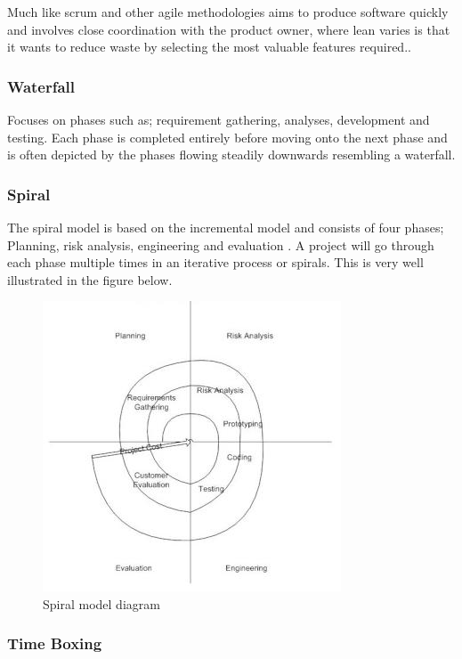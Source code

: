 Much like scrum and other agile methodologies aims to produce software
quickly and involves close coordination with the product owner, where
lean varies is that it wants to reduce waste by selecting the most
valuable features required.\parencite{agilemethods}.

\subsubsection{Waterfall}\label{waterfall}

Focuses on phases such as; requirement gathering, analyses, development
and testing. Each phase is completed entirely before moving onto the
next phase and is often depicted by the phases flowing steadily
downwards resembling a waterfall.

\subsubsection{Spiral}\label{spiral}

The spiral model is based on the incremental model and consists of four
phases; Planning, risk analysis, engineering and evaluation
\parencite{spiral}. A project will go through each phase multiple times
in an iterative process or spirals. This is very well illustrated in the
figure below.

\begin{figure}[htbp]
\centering
\includegraphics{../../Images/Spiral-model.jpg}
\caption{Spiral model diagram \parencite{spiral}}
\end{figure}

\subsubsection{Time Boxing}\label{time-boxing}

